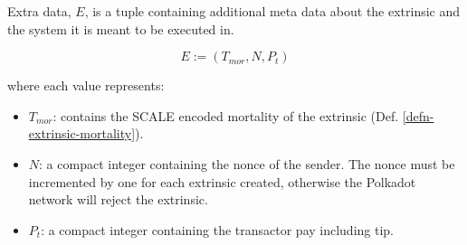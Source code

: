 \begin{definition}
    \label{defn-extra-data}
    Extra data, $E$, is a tuple containing additional meta data about the
    extrinsic and the system it is meant to be executed in.

    \[
        E := (T_{mor}, N, P_t)
    \]

    where each value represents:
    \begin{itemize}
        \item $T_{mor}$: contains the SCALE encoded mortality of the extrinsic (Def.
        \ref{defn-extrinsic-mortality}).
        \item $N$: a compact integer containing the nonce of the sender. The
        nonce must be incremented by one for each extrinsic created, otherwise
        the Polkadot network will reject the extrinsic.
        \item $P_t$: a compact integer containing the transactor pay including tip.
    \end{itemize}

\end{definition}

